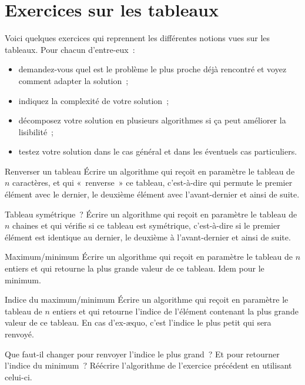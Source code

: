\chapter{Exercices sur les tableaux}

	Voici quelques exercices
	qui reprennent les différentes notions vues sur les tableaux.
	Pour chacun d’entre-eux~:
	\begin{itemize}
	\item
		demandez-vous quel est le problème le plus proche déjà
		rencontré et voyez comment adapter la solution~;
	\item
		indiquez la complexité de votre solution~;
	\item
		décomposez votre solution en plusieurs algorithmes 
		si ça peut améliorer la lisibilité~;
	\item
		testez votre solution dans le cas général
		et dans les éventuels cas particuliers.
	\end{itemize}
	
	\begin{Exercice}{Renverser un tableau}
		Écrire un algorithme qui reçoit en paramètre 
		le tableau  de $n$ caractères, 
		et qui «~renverse~» ce tableau, 
		c’est-à-dire qui permute le premier élément avec le dernier, 
		le deuxième élément avec l’avant-dernier et ainsi de suite.
	\end{Exercice}
	
	\begin{Exercice}{Tableau symétrique~?}
		Écrire un algorithme qui reçoit en paramètre 
		le tableau  de $n$ chaines 
		et qui vérifie si ce tableau est symétrique, 
		c’est-à-dire si le premier élément est identique au dernier, 
		le deuxième à l’avant-dernier et ainsi de suite.
	\end{Exercice}
		
	\begin{Exercice}{Maximum/minimum}
		Écrire un algorithme qui reçoit en paramètre le tableau
		 de $n$ entiers et qui
		retourne la plus grande valeur de ce tableau. Idem pour le minimum.
	\end{Exercice}
	
	\begin{Exercice}{Indice du maximum/minimum}
		\label{ex:indiceminmax}
		Écrire un algorithme qui reçoit en paramètre 
		le tableau  de $n$ entiers 
		et qui retourne l’indice de l’élément contenant 
		la plus grande valeur de ce tableau. 
		En cas d’ex-æquo, c’est l’indice le plus petit qui sera renvoyé.
		
		Que faut-il changer pour renvoyer l’indice le plus grand~?
		Et pour retourner l’indice du minimum~? 
		Réécrire l’algorithme de l’exercice précédent en utilisant celui-ci.
	\end{Exercice}
		
